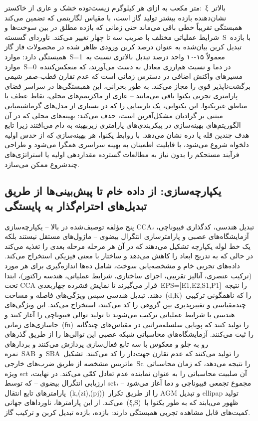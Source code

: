 \documentclass[12pt, a4paper]{article}
\begin{document}
متر مکعب به ازای هر کیلوگرم زیست‌توده خشک و عاری از خاکستر: ξ بالاتر نشان‌دهنده بازده بیشتر تولید گاز است، با مقیاس لگاریتمی که تضمین می‌کند همبستگی تقریباً خطی باقی می‌ماند حتی زمانی که بازده مطلق در بین سوخت‌ها و شرایط عملیاتی مختلف با ضریب سه تا چهار تغییر می‌کند. ناوردای گسسته S با بازده تبدیل کربن بیان‌شده به عنوان درصد کربن ورودی ظاهر شده در محصولات فاز گاز همبستگی دارد: موارد S=1 معمولاً ۱۵-۱۰ واحد درصد تبدیل بالاتری نسبت به موارد S=0 در دما و نسبت هم‌ارزی معادل به دست می‌آورند، که منعکس‌کننده مسیرهای واکنش اضافی در دسترس زمانی است که عدم تقارن قطب-صفر شیمی برگشت‌ناپذیر قوی را مجاز می‌کند. به طور بحرانی، این همبستگی‌ها در سراسر فضای پارامتری تجربی یکنوا باقی می‌مانند – عاری از ماکزیمم‌های محلی، نقاط عطف یا مناطق غیریکنوا. این یکنوایی، یک نارسایی را که در بسیاری از مدل‌های گرماشیمیایی مبتنی بر گرادیان مشکل‌آفرین است، حذف می‌کند: بهینه‌های محلی که در آن الگوریتم‌های بهینه‌سازی در پیکربندی‌های پارامتری زیربهینه به دام می‌افتند زیرا تابع هدف چندین قله یا دره نشان می‌دهد. با روابط یکنوا، هر بهینه‌سازی که از حدس اولیه دلخواه شروع می‌شود، با قابلیت اطمینان به بهینه سراسری همگرا می‌شود و طراحی فرآیند مستحکم را بدون نیاز به مطالعات گسترده مقداردهی اولیه یا استراتژی‌های چندشروع ممکن می‌سازد.

\subsection{یکپارچه‌سازی: از داده خام تا پیش‌بینی‌ها از طریق تبدیل‌های احترام‌گذار به پایستگی}

پنج مؤلفه توصیف‌شده در بالا – یکپارچه‌سازی CCA، تبدیل هندسی، کدگذاری فیبوناچی، آزمایشگاه‌های عصبی و پارامترسازی انتگرال بیضوی – ماژول‌های مستقل نیستند بلکه یک خط لوله یکپارچه تشکیل می‌دهند که در آن هر مرحله مرحله بعدی را تغذیه می‌کند در حالی که به تدریج ابعاد را کاهش می‌دهد و ساختار با معنی فیزیکی استخراج می‌کند. داده‌های تجربی خام و مشخصه‌یابی سوخت، شامل ده‌ها اندازه‌گیری برای هر مورد (ترکیب عنصری، آنالیز تقریبی، اجزای ساختاری، شرایط عملیاتی، هندسه راکتور)، ابتدا تحت CCA قرار می‌گیرند تا نمایش فشرده چهاربعدی EPS=[E1,E2,S1,P1] را نتیجه دهند. تبدیل هندسی سپس ویژگی‌های فاصله و مساحت (d,K) را که ناهمگونی ترکیبی چندمقیاسی و تغییرپذیری بین گروهی را کد می‌کنند، استخراج می‌کند. این ویژگی‌های هندسی با شرایط عملیاتی ترکیب می‌شوند تا تولید توالی فیبوناچی را آغاز کنند و جاسازی‌های زمانی (fn) را تولید کنند که پویایی سلسله‌مراتبی در مقیاس‌های چندگانه را ثبت می‌کنند. آزمایشگاه‌های محاسباتی شبکه عصبی این توالی‌ها را از طریق گذرهای رو به جلو و معکوس با سه تابع فعال‌سازی پردازش می‌کنند و بردارهای نمره SAB و SBA را تولید می‌کنند که عدم تقارن جهت‌دار را کد می‌کنند. تشکیل ماتریس مشخصه از طریق ضرب‌های خارجی Sc را نتیجه می‌دهد، که زمان محاسباتی ویژه sct آن صلبیت محاسباتی را به عنوان نماینده عدم تعادل کمّی می‌کند. در نهایت، ارزیابی انتگرال بیضوی – که توسط sct، مجموع تجمعی فیبوناچی و دما آغاز می‌شود – پارامترهای تابع انتقال (k,(zi),(pj)) را از طریق تکرار AGM و تبدیل ellipap تولید می‌کند. از این پارامترها، ناورداهای جهانی (ξ,S) ظهور می‌یابند که به طور یکنوا با کمیت‌های قابل مشاهده تجربی همبستگی دارند: بازده، بازده تبدیل کربن و ترکیب گاز.
\end{document}
